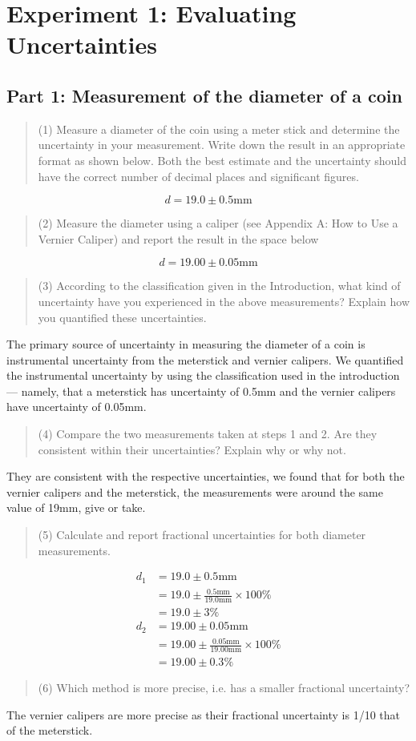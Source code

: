 \documentclass[8pt]{extarticle}
\title{}
\author{Avinash Iyer}
\date{}
\newcommand{\plain}[1]{\textrm{#1}}
\begin{document}
\section*{Experiment 1: Evaluating Uncertainties}
\subsection*{Part 1: Measurement of the diameter of a coin}
\begin{quote}
	(1) Measure a diameter of the coin using a meter stick and determine the uncertainty in your measurement. Write down the result in an appropriate format as shown below. Both the best estimate and the uncertainty should have the correct number of decimal places and significant figures.
\end{quote}
\[ d = 19.0 \pm 0.5 \plain{mm} \]
\begin{quote}
	(2) Measure the diameter using a caliper (see Appendix A: How to Use a Vernier Caliper) and report the result in the space below
\end{quote}
\[ d = 19.00 \pm 0.05 \plain{mm} \]
\begin{quote}
	(3) According to the classification given in the Introduction, what kind of uncertainty have you experienced in the above measurements? Explain how you quantified these uncertainties.
\end{quote}
The primary source of uncertainty in measuring the diameter of a coin is instrumental uncertainty from the meterstick and vernier calipers. We quantified the instrumental uncertainty by using the classification used in the introduction — namely, that a meterstick has uncertainty of 0.5mm and the vernier calipers have uncertainty of 0.05mm.
\begin{quote}
	(4) Compare the two measurements taken at steps 1 and 2. Are they consistent within their uncertainties? Explain why or why not.
\end{quote}
They are consistent with the respective uncertainties, we found that for both the vernier calipers and the meterstick, the measurements were around the same value of 19mm, give or take.
\begin{quote}
	(5) Calculate and report fractional uncertainties for both diameter measurements.
\end{quote}
\begin{align*}
	d_1 &= 19.0 \pm 0.5\plain{mm}\\
	&= 19.0 \pm \frac{0.5\plain{mm}}{19.0\plain{mm}}\times100\%\\
	&= 19.0 \pm 3\%\\
	d_2 &= 19.00 \pm 0.05 \plain{mm}\\
	&= 19.00 \pm \frac{0.05\plain{mm}}{19.00\plain{mm}}\times 100\%\\
	&= 19.00 \pm 0.3\%
\end{align*}
\begin{quote}
	(6) Which method is more precise, i.e. has a smaller fractional uncertainty?
\end{quote}
The vernier calipers are more precise as their fractional uncertainty is 1/10 that of the meterstick.
\end{document}
